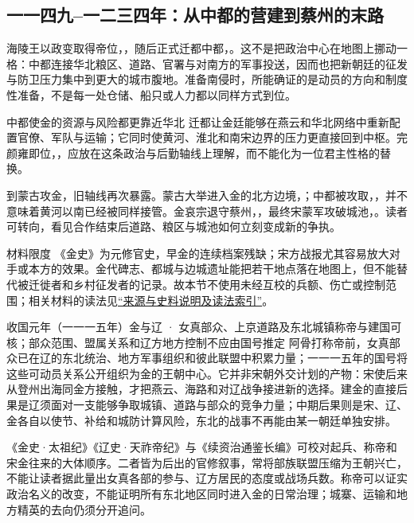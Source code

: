 \subsection{一一四九--一二三四年：从中都的营建到蔡州的末路}
海陵王以政变取得帝位，，随后正式迁都中都，。这不是把政治中心在地图上挪动一格：中都连接华北粮区、道路、官署与对南方的军事投送，因而也把新朝廷的征发与防卫压力集中到更大的城市腹地。准备南侵时，所能确证的是动员的方向和制度性准备，不是每一处仓储、船只或人力都以同样方式到位。

\begin{turningpoint}{中都使金的资源与风险都更靠近华北}
迁都让金廷能够在燕云和华北网络中重新配置官僚、军队与运输；它同时使黄河、淮北和南宋边界的压力更直接回到中枢。完颜雍即位，，应放在这条政治与后勤轴线上理解，而不能化为一位君主性格的替换。
\end{turningpoint}

到蒙古攻金，旧轴线再次暴露。蒙古大举进入金的北方边境，；中都被攻取，，并不意味着黄河以南已经被同样接管。金哀宗退守蔡州，，最终宋蒙军攻破城池，。读者可转向，看见合作结束后道路、粮区与城池如何立刻变成新的争执。

\begin{sourcenote}{材料限度}
《金史》为元修官史，早金的连续档案残缺；宋方战报尤其容易放大对手或本方的效果。金代碑志、都城与边城遗址能把若干地点落在地图上，但不能替代被迁徙者和乡村征发者的记录。故本节不使用未经互校的兵额、伤亡或控制范围；相关材料的读法见\hyperref[app:sources]{“来源与史料说明及读法索引”}。
\end{sourcenote}

\begin{event}{}{收国元年（一一一五年）}{金与辽 · 女真部众、上京道路及东北城镇}{称帝与建国可核；部众范围、盟属关系和辽方地方控制不应由国号推定}
阿骨打称帝前，女真部众已在辽的东北统治、地方军事组织和彼此联盟中积累力量；一一一五年的国号将这些可动员关系公开组织为金的王朝中心。它并非宋朝外交计划的产物：宋使后来从登州出海同金方接触，才把燕云、海路和对辽战争接进新的选择。建金的直接后果是辽须面对一支能够争取城镇、道路与部众的竞争力量；中期后果则是宋、辽、金各自以使节、补给和城防计算风险，东北的战事不再能由某一朝廷单独安排。

《金史·太祖纪》《辽史·天祚帝纪》与《续资治通鉴长编》可校对起兵、称帝和宋金往来的大体顺序。二者皆为后出的官修叙事，常将部族联盟压缩为王朝兴亡，不能让读者据此量出女真各部的参与、辽方居民的态度或战场兵数。称帝可以证实政治名义的改变，不能证明所有东北地区同时进入金的日常治理；城寨、运输和地方精英的去向仍须分开追问。
\end{event}
